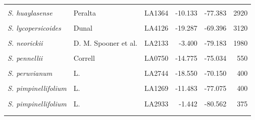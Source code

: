 \documentclass[
  letterpaper,
  DIV=11,
  numbers=noendperiod]{scrartcl}
\begin{document}
\begin{landscape}
\begin{longtable}{>{\raggedright\arraybackslash}p{3.25cm}llrrr}
\em{\cellcolor{gray!10}{S. huaylasense}} & \cellcolor{gray!10}{Peralta} & \cellcolor{gray!10}{LA1360} & \cellcolor{gray!10}{-9.546} & \cellcolor{gray!10}{-77.929} & \cellcolor{gray!10}{1490}\\
\addlinespace
\em{S. huaylasense} & Peralta & LA1364 & -10.133 & -77.383 & 2920\\
\em{\cellcolor{gray!10}{S. lycopersicoides}} & \cellcolor{gray!10}{Dunal} & \cellcolor{gray!10}{LA2951} & \cellcolor{gray!10}{-19.317} & \cellcolor{gray!10}{-69.450} & \cellcolor{gray!10}{2200}\\
\em{S. lycopersicoides} & Dunal & LA4126 & -19.287 & -69.396 & 3120\\
\em{\cellcolor{gray!10}{S. neorickii}} & \cellcolor{gray!10}{D. M. Spooner et al.} & \cellcolor{gray!10}{LA1322} & \cellcolor{gray!10}{-13.483} & \cellcolor{gray!10}{-72.442} & \cellcolor{gray!10}{2380}\\
\em{S. neorickii} & D. M. Spooner et al. & LA2133 & -3.400 & -79.183 & 1980\\
\addlinespace
\em{\cellcolor{gray!10}{S. pennellii}} & \cellcolor{gray!10}{Correll} & \cellcolor{gray!10}{LA0716} & \cellcolor{gray!10}{-16.225} & \cellcolor{gray!10}{-73.617} & \cellcolor{gray!10}{50}\\
\em{S. pennellii} & Correll & LA0750 & -14.775 & -75.034 & 550\\
\em{\cellcolor{gray!10}{S. pennellii}} & \cellcolor{gray!10}{Correll} & \cellcolor{gray!10}{LA3778} & \cellcolor{gray!10}{-14.775} & \cellcolor{gray!10}{-75.034} & \cellcolor{gray!10}{616}\\
\em{S. peruvianum} & L. & LA2744 & -18.550 & -70.150 & 400\\
\em{\cellcolor{gray!10}{S. peruvianum}} & \cellcolor{gray!10}{L.} & \cellcolor{gray!10}{LA2964} & \cellcolor{gray!10}{-18.028} & \cellcolor{gray!10}{-70.835} & \cellcolor{gray!10}{75}\\
\addlinespace
\em{S. pimpinellifolium} & L. & LA1269 & -11.483 & -77.075 & 400\\
\em{\cellcolor{gray!10}{S. pimpinellifolium}} & \cellcolor{gray!10}{L.} & \cellcolor{gray!10}{LA1589} & \cellcolor{gray!10}{-8.433} & \cellcolor{gray!10}{-78.817} & \cellcolor{gray!10}{30}\\
\em{S. pimpinellifolium} & L. & LA2933 & -1.442 & -80.562 & 375\\
\em{\cellcolor{gray!10}{S. sitiens}} & \cellcolor{gray!10}{I. M. Johnst.} & \cellcolor{gray!10}{LA4116} & \cellcolor{gray!10}{-22.159} & \cellcolor{gray!10}{-68.782} & \cellcolor{gray!10}{2960}\\*

\end{longtable}

\end{landscape}
\end{document}
